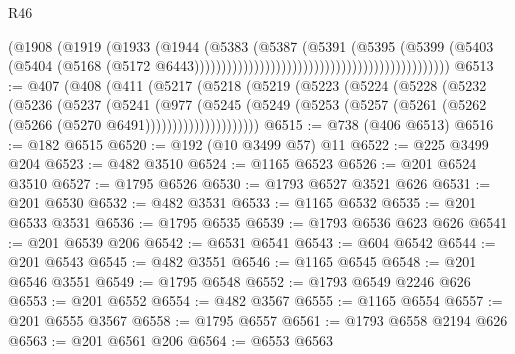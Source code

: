 \begin{lexlean}{R46}
\begin{coremodule}
                                                                        (@1908
                                                                          (@1919
                                                                            (@1933
                                                                              (@1944
                                                                                (@5383
                                                                                  (@5387
                                                                                    (@5391
                                                                                      (@5395
                                                                                        (@5399
                                                                                          (@5403
                                                                                            (@5404
                                                                                              (@5168
                                                                                                (@5172
                                                                                                  @6443)))))))))))))))))))))))))))))))))))))))))))))))
@6513 := @407
    (@408
      (@411
        (@5217
          (@5218
            (@5219
              (@5223
                (@5224
                  (@5228
                    (@5232
                      (@5236
                        (@5237
                          (@5241
                            (@977
                              (@5245
                                (@5249
                                  (@5253
                                    (@5257 (@5261 (@5262 (@5266 (@5270 @6491)))))))))))))))))))))
@6515 := @738 (@406 @6513)
@6516 := @182 @6515
@6520 := @192 (@10 @3499 @57) @11
@6522 := @225 @3499 @204
@6523 := @482 @3510
@6524 := @1165 @6523
@6526 := @201 @6524 @3510
@6527 := @1795 @6526
@6530 := @1793 @6527 @3521 @626
@6531 := @201 @6530
@6532 := @482 @3531
@6533 := @1165 @6532
@6535 := @201 @6533 @3531
@6536 := @1795 @6535
@6539 := @1793 @6536 @623 @626
@6541 := @201 @6539 @206
@6542 := @6531 @6541
@6543 := @604 @6542
@6544 := @201 @6543
@6545 := @482 @3551
@6546 := @1165 @6545
@6548 := @201 @6546 @3551
@6549 := @1795 @6548
@6552 := @1793 @6549 @2246 @626
@6553 := @201 @6552
@6554 := @482 @3567
@6555 := @1165 @6554
@6557 := @201 @6555 @3567
@6558 := @1795 @6557
@6561 := @1793 @6558 @2194 @626
@6563 := @201 @6561 @206
@6564 := @6553 @6563

\end{coremodule}
\end{lexlean}
